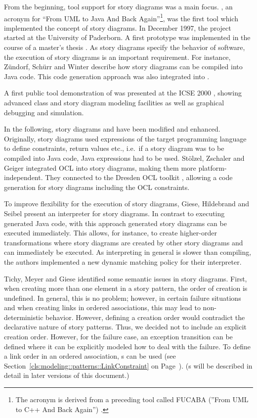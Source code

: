 From the beginning, tool support for story diagrams was a main focus.
\fuj, an acronym for ``From UML to Java And Back Again''\footnote{The acronym is derived from a preceding tool called FUCABA (''From UML to C++ And Back Again'') \cite{JZ97}.}, was the first tool which implemented the concept of story diagrams.
In December 1997, the project started at the University of Paderborn.
A first prototype was implemented in the course of a master's thesis \cite{FNT98}.
As story diagrams specify the behavior of software, the execution of story diagrams is an important requirement.
For instance, Z\"{u}ndorf, Sch\"{u}rr and Winter \cite{ZSW99} describe how story diagrams can be compiled into Java code.
This code generation approach was also integrated into \fuj.

A first public tool demonstration of \fuj was presented at the ICSE 2000 \cite{NNZ00}, showing advanced class and story diagram modeling facilities as well as graphical debugging and simulation.

In the following, story diagrams and \fuj have been modified and enhanced.
Originally, story diagrams used expressions of the target programming language to define constraints, return values etc.,
i.e.\ if a story diagram was to be compiled into Java code, Java expressions had to be used.
St\"{o}lzel, Zschaler and Geiger \cite{SZG07} integrated OCL into story diagrams, making them more platform-independent.
They connected \fuj to the Dresden OCL toolkit \cite{DresdenOCL}, allowing a code generation for story diagrams including the OCL constraints.

To improve flexibility for the execution of story diagrams, Giese, Hildebrand and Seibel \cite{GHS09} present an interpreter for story diagrams.
In contrast to executing generated Java code, with this approach generated story diagrams can be executed immediately.
This allows, for instance, to create higher-order transformations where story diagrams are created by other story diagrams and can immediately be executed.
As interpreting in general is slower than compiling, the authors implemented a new dynamic matching policy for their interpreter.


Tichy, Meyer and Giese \cite{TMG06} identified some semantic issues in story diagrams.
First, when creating more than one element in a story pattern, the order of creation is undefined.
In general, this is no problem; however, in certain failure situations and when creating links in ordered associations, this may lead to non-deterministic behavior.
However, defining a creation order would contradict the declarative nature of story patterns.
Thus, we decided not to include an explicit creation order.
However, for the failure case, an exception transition can be defined where it can be explicitly modeled how to deal with the failure.
To define a link order in an ordered association, s can be used (see Section~\ref{cls:modeling::patterns::LinkConstraint} on Page~\pageref{cls:modeling::patterns::LinkConstraint}).
(s will be described in detail in later versions of this document.)

